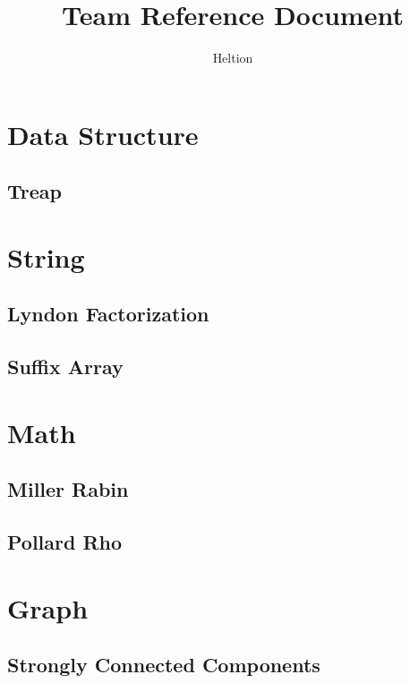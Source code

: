\documentclass{article}
\begin{document}
\title{Team Reference Document}
\author{Heltion}
\maketitle
\newpage
\begin{multicols}{2}
    \tableofcontents
    \newpage
    \section{Data Structure}
    \subsection{Treap}
    

    \section{String}
    \subsection{Lyndon Factorization}
    
    \subsection{Suffix Array}
    
    
    \section{Math}
    \subsection{Miller Rabin}
    
    \subsection{Pollard Rho}
    

    \section{Graph}
    \subsection{Strongly Connected Components}
    
\end{multicols}
\end{document}
